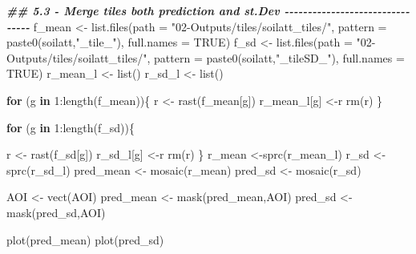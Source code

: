 \documentclass[
  10pt,
  b5paper,
  oneside]{book}
\newenvironment{Shaded}{\begin{snugshade}}{\end{snugshade}}
\newcommand{\AttributeTok}[1]{\textcolor[rgb]{0.77,0.63,0.00}{#1}}
\newcommand{\ConstantTok}[1]{\textcolor[rgb]{0.00,0.00,0.00}{#1}}
\newcommand{\ControlFlowTok}[1]{\textcolor[rgb]{0.13,0.29,0.53}{\textbf{#1}}}
\newcommand{\DecValTok}[1]{\textcolor[rgb]{0.00,0.00,0.81}{#1}}
\newcommand{\DocumentationTok}[1]{\textcolor[rgb]{0.56,0.35,0.01}{\textbf{\textit{#1}}}}
\newcommand{\FunctionTok}[1]{\textcolor[rgb]{0.00,0.00,0.00}{#1}}
\newcommand{\NormalTok}[1]{#1}
\newcommand{\OtherTok}[1]{\textcolor[rgb]{0.56,0.35,0.01}{#1}}
\newcommand{\SpecialCharTok}[1]{\textcolor[rgb]{0.00,0.00,0.00}{#1}}
\newcommand{\StringTok}[1]{\textcolor[rgb]{0.31,0.60,0.02}{#1}}
\begin{document}
\begin{Shaded}
\begin{Highlighting}[]
\DocumentationTok{\#\# 5.3 {-} Merge tiles both prediction and st.Dev {-}{-}{-}{-}{-}{-}{-}{-}{-}{-}{-}{-}{-}{-}{-}{-}{-}{-}{-}{-}{-}{-}{-}{-}{-}{-}{-}{-}{-}{-}{-}{-}}
\NormalTok{f\_mean }\OtherTok{\textless{}{-}} \FunctionTok{list.files}\NormalTok{(}\AttributeTok{path =} \StringTok{"02{-}Outputs/tiles/soilatt\_tiles/"}\NormalTok{, }
                     \AttributeTok{pattern =} \FunctionTok{paste0}\NormalTok{(soilatt,}\StringTok{"\_tile\_"}\NormalTok{), }\AttributeTok{full.names =} \ConstantTok{TRUE}\NormalTok{)}
\NormalTok{f\_sd }\OtherTok{\textless{}{-}} \FunctionTok{list.files}\NormalTok{(}\AttributeTok{path =} \StringTok{"02{-}Outputs/tiles/soilatt\_tiles/"}\NormalTok{, }
                   \AttributeTok{pattern =}  \FunctionTok{paste0}\NormalTok{(soilatt,}\StringTok{"\_tileSD\_"}\NormalTok{), }\AttributeTok{full.names =} \ConstantTok{TRUE}\NormalTok{)}
\NormalTok{r\_mean\_l }\OtherTok{\textless{}{-}} \FunctionTok{list}\NormalTok{()}
\NormalTok{r\_sd\_l }\OtherTok{\textless{}{-}} \FunctionTok{list}\NormalTok{()}

\ControlFlowTok{for}\NormalTok{ (g }\ControlFlowTok{in} \DecValTok{1}\SpecialCharTok{:}\FunctionTok{length}\NormalTok{(f\_mean))\{}
\NormalTok{  r }\OtherTok{\textless{}{-}} \FunctionTok{rast}\NormalTok{(f\_mean[g])}
\NormalTok{  r\_mean\_l[g] }\OtherTok{\textless{}{-}}\NormalTok{r}
  \FunctionTok{rm}\NormalTok{(r)}
\NormalTok{\}}

\ControlFlowTok{for}\NormalTok{ (g }\ControlFlowTok{in} \DecValTok{1}\SpecialCharTok{:}\FunctionTok{length}\NormalTok{(f\_sd))\{}
  
\NormalTok{  r }\OtherTok{\textless{}{-}} \FunctionTok{rast}\NormalTok{(f\_sd[g])}
\NormalTok{  r\_sd\_l[g] }\OtherTok{\textless{}{-}}\NormalTok{r}
  \FunctionTok{rm}\NormalTok{(r)}
\NormalTok{\}}
\NormalTok{r\_mean }\OtherTok{\textless{}{-}}\FunctionTok{sprc}\NormalTok{(r\_mean\_l)}
\NormalTok{r\_sd }\OtherTok{\textless{}{-}}\FunctionTok{sprc}\NormalTok{(r\_sd\_l)}
\NormalTok{pred\_mean }\OtherTok{\textless{}{-}} \FunctionTok{mosaic}\NormalTok{(r\_mean)}
\NormalTok{pred\_sd }\OtherTok{\textless{}{-}} \FunctionTok{mosaic}\NormalTok{(r\_sd)}

\NormalTok{AOI }\OtherTok{\textless{}{-}} \FunctionTok{vect}\NormalTok{(AOI)}
\NormalTok{pred\_mean }\OtherTok{\textless{}{-}} \FunctionTok{mask}\NormalTok{(pred\_mean,AOI)}
\NormalTok{pred\_sd }\OtherTok{\textless{}{-}} \FunctionTok{mask}\NormalTok{(pred\_sd,AOI)}


\FunctionTok{plot}\NormalTok{(pred\_mean)}
\FunctionTok{plot}\NormalTok{(pred\_sd)}
\end{Highlighting}
\end{Shaded}
\end{document}
